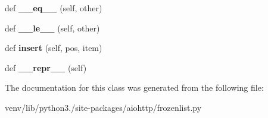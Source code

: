 \begin{DoxyCompactItemize}
\item 
\mbox{\label{classaiohttp_1_1frozenlist_1_1_frozen_list_a6a932e1ab4deda0104fe16ff570d87b6}} 
def {\bfseries \+\_\+\+\_\+eq\+\_\+\+\_\+} (self, other)
\item 
\mbox{\label{classaiohttp_1_1frozenlist_1_1_frozen_list_af89aa22a9d4271ef46af27b21a2a1167}} 
def {\bfseries \+\_\+\+\_\+le\+\_\+\+\_\+} (self, other)
\item 
\mbox{\label{classaiohttp_1_1frozenlist_1_1_frozen_list_adda9ebb79c68024916713cecc48c2d49}} 
def {\bfseries insert} (self, pos, item)
\item 
\mbox{\label{classaiohttp_1_1frozenlist_1_1_frozen_list_a6d073a30d639579fc788b7756f2078f2}} 
def {\bfseries \+\_\+\+\_\+repr\+\_\+\+\_\+} (self)
\end{DoxyCompactItemize}


The documentation for this class was generated from the following file\+:\begin{DoxyCompactItemize}
\item 
venv/lib/python3./site-\/packages/aiohttp/frozenlist.\+py\end{DoxyCompactItemize}
